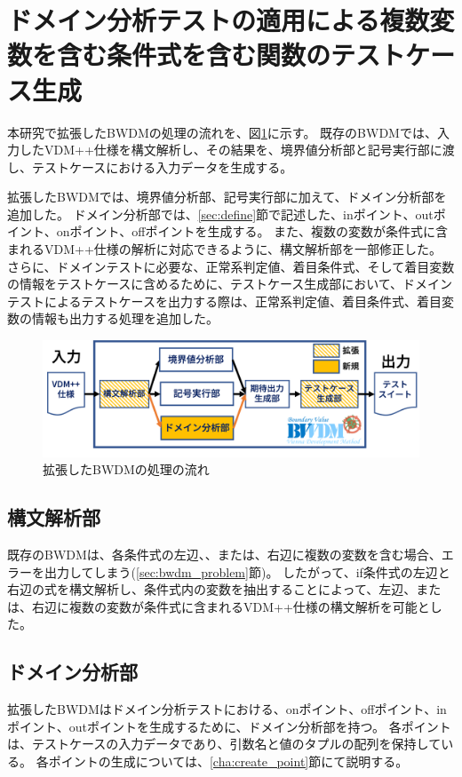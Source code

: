 \documentclass[uplatex, report, a4j, 10pt]{jsbook}
\begin{document}
\section{ドメイン分析テストの適用による複数変数を含む条件式を含む関数のテストケース生成}\label{sec:extendDomain}

本研究で拡張したBWDMの処理の流れを、図\ref{fig:bwdm_structure}に示す。
既存のBWDMでは、入力したVDM++仕様を構文解析し、その結果を、境界値分析部と記号実行部に渡し、テストケースにおける入力データを生成する。

拡張したBWDMでは、境界値分析部、記号実行部に加えて、ドメイン分析部を追加した。
ドメイン分析部では、\ref{sec:define}節で記述した、inポイント、outポイント、onポイント、offポイントを生成する。
また、複数の変数が条件式に含まれるVDM++仕様の解析に対応できるように、構文解析部を一部修正した。
さらに、ドメインテストに必要な、正常系判定値、着目条件式、そして着目変数の情報をテストケースに含めるために、テストケース生成部において、ドメインテストによるテストケースを出力する際は、正常系判定値、着目条件式、着目変数の情報も出力する処理を追加した。

\begin{figure}[t]
  \begin{center}
    \includegraphics[keepaspectratio, width=160mm]{figs/bwdm_structure.png}
    \caption{拡張したBWDMの処理の流れ}
    \label{fig:bwdm_structure}
  \end{center}
\end{figure}

\subsection{構文解析部}
既存のBWDMは、各条件式の左辺、、または、右辺に複数の変数を含む場合、エラーを出力してしまう(\ref{sec:bwdm_problem}節)。
したがって、if条件式の左辺と右辺の式を構文解析し、条件式内の変数を抽出することによって、左辺、または、右辺に複数の変数が条件式に含まれるVDM++仕様の構文解析を可能とした。

\subsection{ドメイン分析部}\label{cha:DomainAnalyzer}
拡張したBWDMはドメイン分析テストにおける、onポイント、offポイント、inポイント、outポイントを生成するために、ドメイン分析部を持つ。
各ポイントは、テストケースの入力データであり、引数名と値のタプルの配列を保持している。
各ポイントの生成については、\ref{cha:create_point}節にて説明する。
\end{document}
